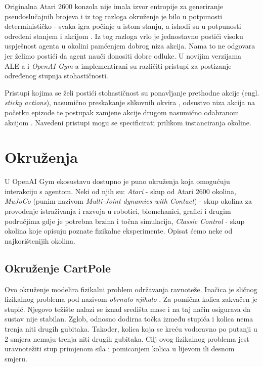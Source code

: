 Originalna Atari 2600 konzola nije imala izvor entropije za generiranje pseudoslučajnih brojeva i iz tog razloga okruženje je bilo u potpunosti determinističko - svaka igra počinje u istom stanju, a ishodi su u potpunosti određeni stanjem i akcijom \cite{AleDeterministic}. Iz tog razloga vrlo je jednostavno postići visoku uspješnost agenta u okolini pamćenjem dobrog niza akcija. Nama to ne odgovara jer želimo postići da agent nauči donositi dobre odluke. U novijim verzijama ALE-a i \textit{OpenAI Gym}-a implementirani su različiti pristupi za postizanje određenog stupnja stohastičnosti. 

Pristupi kojima se želi postići stohastičnost su ponavljanje prethodne akcije (engl. \textit{sticky actions}), nasumično preskakanje slikovnih okvira , odsustvo niza akcija na početku epizode  te postupak zamjene akcije drugom nasumično odabranom akcijom . Navedeni pristupi mogu se specificirati prilikom instanciranja okoline. 

\section{Okruženja}

U OpenAI Gym ekosustavu dostupno je puno okruženja koja omogućuju interakciju s agentom. Neki od njih su: \textit{Atari} - skup od Atari 2600 okolina, \textit{MuJoCo} (punim nazivom \textit{Multi-Joint dynamics with Contact}) - skup okolina za provođenje istraživanja i razvoja u robotici, biomehanici, grafici i drugim područjima gdje je potrebna brzina i točna simulacija, \textit{Classic Control} - skup okolina koje opisuju poznate fizikalne eksperimente. Opisat ćemo neke od najkorištenijih okolina.

\subsection{Okruženje CartPole}

Ovo okruženje modelira fizikalni problem održavanja ravnoteže. Inačica je sličnog fizikalnog problema pod nazivom \textit{obrnuto njihalo} . Za pomična kolica zakvačen je stupić. Njegovo težište nalazi se iznad središta mase i na taj način osigurava da sustav nije stabilan.  Zglob, odnosno dodirna točka između stupića i kolica nema trenja niti drugih gubitaka. Također, kolica koja se kreću vodoravno po putanji u 2 smjera nemaju trenja niti drugih gubitaka. Cilj ovog fizikalnog problema jest uravnotežiti stup primjenom sila i pomicanjem kolica u lijevom ili desnom smjeru.

